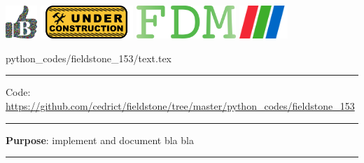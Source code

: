 \noindent
\includegraphics[height=1.25cm]{images/pictograms/benchmark}
\includegraphics[height=1.25cm]{images/pictograms/under_construction}
\includegraphics[height=1.25cm]{images/pictograms/FDM}
\includegraphics[height=1.25cm]{images/pictograms/paraview}



\begin{flushright} {\tiny {\color{gray} python\_codes/fieldstone\_153/text.tex}} \end{flushright}

%

\par\noindent\rule{\textwidth}{0.4pt}

\begin{center}
\inpython
{\small Code: \url{https://github.com/cedrict/fieldstone/tree/master/python_codes/fieldstone_153}}
\end{center}

\par\noindent\rule{\textwidth}{0.4pt}


{\bf \color{teal} Purpose}: implement and document bla bla 

\par\noindent\rule{\textwidth}{0.4pt}


